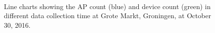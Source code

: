 \begin{figure}[H]
\begin{adjustwidth}{-3cm}{}
{{		  }
		}\\
		\caption{Line charts showing the \ac{AP} count (blue) and device count (green) in different data collection time at Grote Markt, Groningen, at October 30, 2016.}
		\label{fig:time-effect}
		\end{adjustwidth}
	\end{figure}

